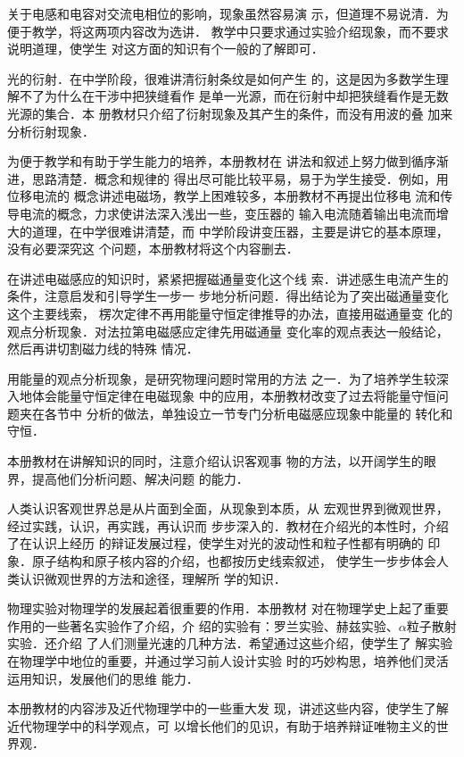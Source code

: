 关于电感和电容对交流电相位的影响，现象虽然容易演
示，但道理不易说清．为便于教学，将这两项内容改为选讲．
教学中只要求通过实验介绍现象，而不要求说明道理，使学生
对这方面的知识有个一般的了解即可．

光的衍射．在中学阶段，很难讲清衍射条纹是如何产生
的，这是因为多数学生理解不了为什么在干涉中把狭缝看作
是单一光源，而在衍射中却把狭缝看作是无数光源的集合．本
册教材只介绍了衍射现象及其产生的条件，而没有用波的叠
加来分析衍射现象．

为便于教学和有助于学生能力的培养，本册教材在
讲法和叙述上努力做到循序渐进，思路清楚．概念和规律的
得出尽可能比较平易，易于为学生接受．例如，用位移电流的
概念讲述电磁场，教学上困难较多，本册教材不再提出位移电
流和传导电流的概念，力求使讲法深入浅出一些，变压器的
输入电流随着输出电流而增大的道理，在中学很难讲清楚，而
中学阶段讲变压器，主要是讲它的基本原理，没有必要深究这
个问题，本册教材将这个内容删去．

在讲述电磁感应的知识时，紧紧把握磁通量变化这个线
索．讲述感生电流产生的条件，注意启发和引导学生一步一
步地分析问题．得出结论为了突出磁通量变化这个主要线索，
楞次定律不再用能量守恒定律推导的办法，直接用磁通量变
化的观点分析现象．对法拉第电磁感应定律先用磁通量
变化率的观点表达一般结论，然后再讲切割磁力线的特殊
情况．

用能量的观点分析现象，是研究物理问题时常用的方法
之一．为了培养学生较深入地体会能量守恒定律在电磁现象
中的应用，本册教材改变了过去将能量守恒问题夹在各节中
分析的做法，单独设立一节专门分析电磁感应现象中能量的
转化和守恒．

本册教材在讲解知识的同时，注意介绍认识客观事
物的方法，以开阔学生的眼界，提高他们分析问题、解决问题
的能力．

人类认识客观世界总是从片面到全面，从现象到本质，从
宏观世界到微观世界，经过实践，认识，再实践，再认识而
步步深入的．教材在介绍光的本性时，介绍了在认识上经历
的辩证发展过程，使学生对光的波动性和粒子性都有明确的
印象．原子结构和原子核内容的介绍，也都按历史线索叙述，
使学生一步步体会人类认识微观世界的方法和途径，理解所
学的知识．

物理实验对物理学的发展起着很重要的作用．本册教材
对在物理学史上起了重要作用的一些著名实验作了介绍，介
绍的实验有：罗兰实验、赫兹实验、$\alpha$粒子散射实验．还介绍
了人们测量光速的几种方法．希望通过这些介绍，使学生了
解实验在物理学中地位的重要，并通过学习前人设计实验
时的巧妙构思，培养他们灵活运用知识，发展他们的思维
能力．

本册教材的内容涉及近代物理学中的一些重大发
现，讲述这些内容，使学生了解近代物理学中的科学观点，可
以增长他们的见识，有助于培养辩证唯物主义的世界观．

